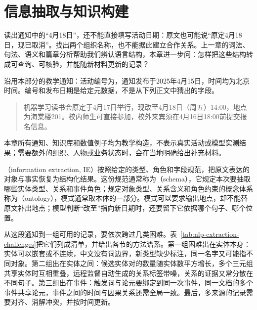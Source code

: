 \chapter{信息抽取与知识构建}
\label{chap:nlp-information-extraction}

读出通知中的“4月18日”，还不能直接填写活动日期：原文也可能说“原定4月18日，现已取消”。找出两个组织名称，也不能据此建立合作关系。上一章的词法、句法、语义和篇章分析帮助我们辨认语言结构，本章进一步问：怎样把这些结构转成可查询、可核验，并能随新材料更新的记录？

沿用本部分的教学通知：活动编号为，通知发布于2025年4月15日，时间均为北京时间。编号和发布日期是给定元数据，不是从下列正文中猜出的字段。
\begin{quote}
机器学习读书会原定于4月17日举行，现改至4月18日（周五）14:00，地点为海棠楼201。校内师生可直接参加，校外来宾须在4月16日18:00前提交报名信息。
\end{quote}
本章所有通知、知识库和数值例子均为教学构造，不表示真实活动或模型实测结果；需要额外的组织、人物或业务状态时，会在当地明确给出补充材料。

（information extraction, IE）按照给定的类型、角色和字段规范，把原文表达的对象与事实恢复为结构化结果。这份规范通常称为（schema），它规定本次要抽取哪些实体类型、关系和事件角色；规定对象类型、关系含义和角色约束的概念体系称为（ontology），模式通常取本体的一部分。模式可以要求输出地点，却不能替原文补出地点；模型判断“改至”指向新日期时，还要留下它依据哪个句子、哪个位置。

从这段通知到一组可用的记录，要依次跨过几类困难。表~\ref{tab:nlp-extraction-challenges}把它们列成清单，并给出各节的方法谱系。第一组困难出在实体本身：实体可以嵌套或不连续，中文没有词边界，新类型缺少标注，同一名字又可能指不同对象。第二组出在实体之间：候选实体对的数量随实体数平方增长，多个三元组共享实体时互相重叠，远程监督自动生成的关系标签带噪，关系的证据又常分散在不同句子。第三组出在事件：触发词与论元要绑定到同一次事件，同一文档的多个事件共享论元，事件之间的时间与因果关系还需全局一致。最后，多来源的记录需要对齐、消解冲突，并按时间更新。

